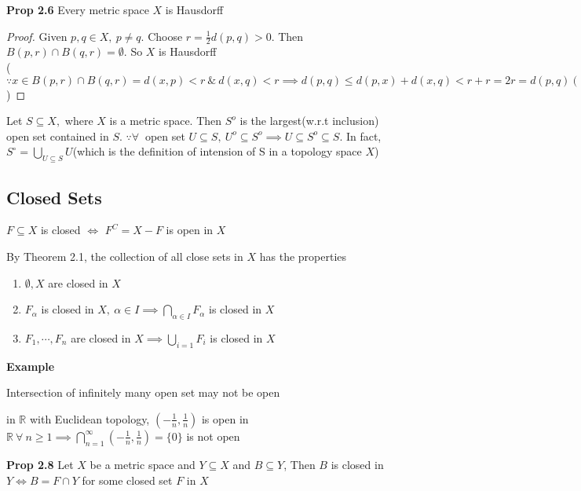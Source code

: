 \textbf{Prop 2.6} Every metric space $X$ is Hausdorff

\begin{proof}
	Given $p,q \in X,~p\neq q$. Choose $r = \frac{1}{2}d(p,q)>0$. Then $B(p,r)\cap B(q,r) = \emptyset$. So $X$ is Hausdorff \\($\because x \in B(p,r) \cap B(q,r) = d(x,p) < r ~\&~ d(x,q) < r \implies d(p,q) \leq d(p,x) + d(x,q) < r+r = 2r = d(p,q) (\rightarrow\leftarrow)$ )
\end{proof} 

\begin{rmk*}
	Let $S \subseteq X,$ where $X$ is a metric space. Then $S^o$ is the largest(w.r.t inclusion) open set contained in $S$. $\because \forall~$ open set $U \subseteq S,~U^o\subseteq S^o \implies U \subseteq S^o \subseteq S$. In fact, $S^\circ = \bigcup_{U \subseteq S}U$(which is the definition of intension of S in a topology space $X$)
\end{rmk*}


\subsection{Closed Sets}

\begin{defn}
	$F \subseteq X$ is closed $\Leftrightarrow$ $F^C = X-F$ is open in $X$
\end{defn}

By Theorem 2.1, the collection of all close sets in $X$ has the properties

\begin{enumerate}[wide,label = \textbf{(\roman*)}]
	\item $\emptyset,X$ are closed in $X$
	\item $F_{\alpha}$ is closed in $X,~\alpha \in I \implies \bigcap_{\alpha \in I}F_{\alpha}$ is closed in $X$
	\item $F_1,\cdots,F_n$ are closed in $X \implies \bigcup_{i=1}F_i$ is closed in $X$
\end{enumerate}

\textbf{Example}

Intersection of infinitely many open set may not be open
	
in $\mathbb R$ with Euclidean topology, $(-\frac{1}{n},\frac{1}{n})$ is open in $\mathbb R ~\forall~n \geq 1 \implies \bigcap_{n=1}^{\infty}(-\frac{1}{n},\frac{1}{n}) = \{0\}$ is not open

\textbf{Prop 2.8} Let $X$ be a metric space and $Y \subseteq X$ and $B \subseteq Y$, Then $B$ is closed in $Y \Leftrightarrow B = F \cap Y$ for some closed set $F$ in $X$

